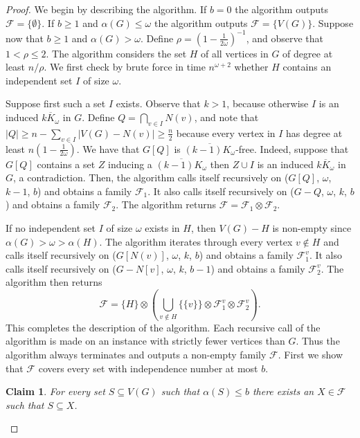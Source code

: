 \documentclass[11pt]{amsart}
\newtheorem{claim}{Claim}[theorem]
\newcommand{\cal}{\mathcal}
\begin{document}
\begin{proof}
We begin by describing the algorithm. If $b = 0$ the algorithm outputs ${\cal F} = \{\emptyset\}$. If $b \geq 1$ and $\alpha(G) \leq \omega$ the algorithm outputs ${\cal F} = \{V(G)\}$. Suppose now that $b \geq 1$ and $\alpha(G) > \omega$.
%
Define $\rho = (1 - \frac{1}{2\omega})^{-1}$, and observe that $1 < \rho \leq 2$. The algorithm considers the set $H$ of all vertices in $G$ of degree at least $n/\rho$. 
We first check by brute force in time $n^{\omega+2}$ whether $H$ contains an independent set $I$ of size $\omega$. 

Suppose first such a set $I$ exists. Observe that $k > 1$, because otherwise $I$ is an induced $\overline{kK_\omega}$ in $G$.
%
Define $Q = \bigcap_{v \in I}N(v)$, and note that $|Q| \geq n - \sum_{v \in I} |V(G) - N(v)| \geq \frac{n}{2}$ because every vertex in $I$ has degree at least $n(1-\frac{1}{2\omega})$.
%
We have that $G[Q]$ is $\overline{(k-1)K_\omega}$-free. Indeed, suppose that $G[Q]$ contains a set $Z$ inducing a $\overline{(k-1)K_\omega}$ then $Z \cup I$ is an induced $\overline{kK_\omega}$ in $G$, a contradiction. 
%
Then, the algorithm calls itself recursively on ($G[Q]$, $\omega$, $k-1$, $b$) and obtains a family ${\cal F}_1$. 
%
It also calls itself recursively on ($G - Q$, $\omega$, $k$, $b$) and obtains a family ${\cal F}_2$.
%
The algorithm returns ${\cal F} = {\cal F}_1 \otimes {\cal F}_2$.

If no independent set $I$ of size $\omega$ exists in $H$, then $V(G) - H$ is non-empty since $\alpha(G) > \omega > \alpha(H)$.
%
The algorithm iterates through every vertex $v \notin H$ and calls itself recursively on ($G[N(v)]$, $\omega$, $k$, $b$) and obtains a family ${\cal F}^v_1$. It also calls itself recursively on  ($G - N[v]$, $\omega$, $k$, $b-1$) and obtains a family ${\cal F}^v_2$.
%
The algorithm then returns 
$${\cal F} = \{H\} \otimes\left( \bigcup_{v \notin H} \{\{v\}\} \otimes {\cal F}_1^v \otimes {\cal F}_2^v \right).$$
This completes the description of the algorithm. Each recursive call of the algorithm is made on an instance with strictly fewer vertices than $G$. Thus the algorithm always terminates and outputs a non-empty family ${\cal F}$. 
%
First we show that ${\cal F}$ covers every set with independence number at most $b$.

\begin{claim}\label{clm:family_covers1}
For every set $S \subseteq V(G)$ such that $\alpha(S) \leq b$ there exists an $X \in {\cal F}$ such that $S \subseteq X$.
\end{claim}


\end{proof}
\end{document}
